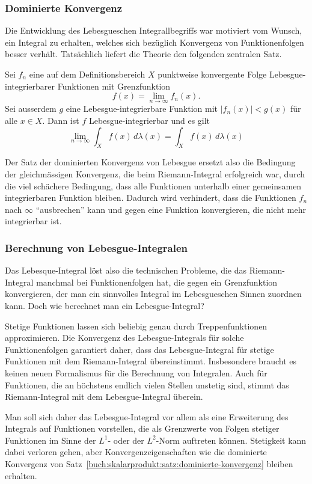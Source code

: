 %
%
\subsubsection{Dominierte Konvergenz}
Die Entwicklung des Lebesgueschen Integrallbegriffs war motiviert
vom Wunsch, ein Integral zu erhalten, welches sich bezüglich
Konvergenz von Funktionenfolgen besser verhält.
Tatsächlich liefert die Theorie den folgenden zentralen Satz.

\begin{satz}
\label{buch:skalarprodukt:satz:dominierte-konvergenz}
Sei $f_n$ eine auf dem Definitionsbereich $X$ punktweise konvergente
Folge Lebesgue-integrierbarer Funktionen mit Grenzfunktion 
\[
f(x) = \lim_{n\to \infty} f_n(x).
\]
Sei ausserdem $g$ eine Lebesgue-integrierbare Funktion mit
$|f_n(x)|<g(x)$ für alle $x\in X$.
Dann ist $f$ Lebesgue-integrierbar und es gilt
\[
\lim_{n\to\infty} \int_X f(x)\,d\lambda(x)
=
\int_X f(x)\,d\lambda(x)
\]
\end{satz}

Der Satz der dominierten Konvergenz von Lebesgue ersetzt also die
Bedingung der gleichmässigen Konvergenz, die beim Riemann-Integral
erfolgreich war, durch die viel schächere Bedingung, dass alle
Funktionen unterhalb einer gemeinsamen integrierbaren Funktion bleiben.
Dadurch wird verhindert, dass die Funktionen $f_n$ nach $\infty$
``ausbrechen'' kann und gegen eine Funktion konvergieren, die nicht
mehr integrierbar ist.


%
%
\subsubsection{Berechnung von Lebesgue-Integralen}
Das Lebesque-Integral löst also die technischen Probleme, die das
Riemann-Integral manchmal bei Funktionenfolgen hat, die gegen ein
Grenzfunktion konvergieren, der man ein sinnvolles Integral im
Lebesgueschen Sinnen zuordnen kann.
Doch wie berechnet man ein Lebesgue-Integral?

Stetige Funktionen lassen sich beliebig genau durch Treppenfunktionen
approximieren.
Die Konvergenz des Lebesgue-Integrals für solche Funktionenfolgen
garantiert daher, dass das Lebesgue-Integral für stetige
Funktionen mit dem Riemann-Integral übereinstimmt.
Insbesondere braucht es keinen neuen Formalismus für die 
Berechnung von Integralen.
Auch für Funktionen, die an höchstens endlich vielen Stellen unstetig
sind, stimmt das Riemann-Integral mit dem Lebesgue-Integral überein.

Man soll sich daher das Lebesgue-Integral vor allem als eine 
Erweiterung des Integrals auf Funktionen vorstellen, die als Grenzwerte
von Folgen stetiger Funktionen im Sinne der $L^1$- oder der $L^2$-Norm
auftreten können.
Stetigkeit kann dabei verloren gehen, aber Konvergenzeigenschaften
wie die dominierte Konvergenz von
Satz~\ref{buch:skalarprodukt:satz:dominierte-konvergenz}
bleiben erhalten.



